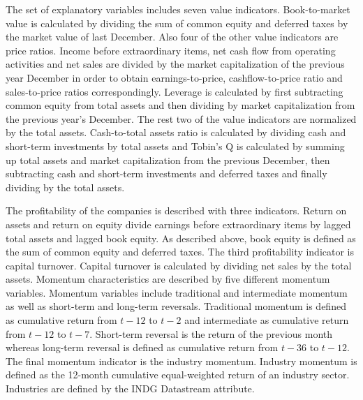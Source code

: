 \documentclass[12pt]{article}
\begin{document}
The set of explanatory variables includes seven value indicators. Book-to-market value is calculated by dividing the sum of common equity and deferred taxes by the market value of last December. Also four of the other value indicators are price ratios. Income before extraordinary items, net cash flow from operating activities and net sales are divided by the market capitalization of the previous year December in order to obtain earnings-to-price, cashflow-to-price ratio and sales-to-price ratios correspondingly. Leverage is calculated by first subtracting common equity from total assets and then dividing by market capitalization from the previous year's December. The rest two of the value indicators are normalized by the total assets. Cash-to-total assets ratio is calculated by dividing cash and short-term investments by total assets and Tobin's Q is calculated by summing up total assets and market capitalization from the previous December, then subtracting cash and short-term investments and deferred taxes and finally dividing by the total assets. \par

The profitability of the companies is described with three indicators. Return on assets and return on equity divide earnings before extraordinary items by lagged total assets and lagged book equity. As described above, book equity is defined as the sum of common equity and deferred taxes. The third profitability indicator is capital turnover. Capital turnover is calculated by dividing net sales by the total assets. Momentum characteristics are described by five different momentum variables. Momentum variables include traditional and intermediate momentum as well as short-term and long-term reversals. Traditional momentum is defined as cumulative return from $t-12$ to $t-2$ and intermediate as cumulative return from $t-12$ to $t-7$. Short-term reversal is the return of the previous month whereas long-term reversal is defined as cumulative return from $t-36$ to $t-12$. The final momentum indicator is the industry momentum. Industry momentum is defined as the 12-month cumulative equal-weighted return of an industry sector. Industries are defined by the INDG Datastream attribute. \par
\end{document}
